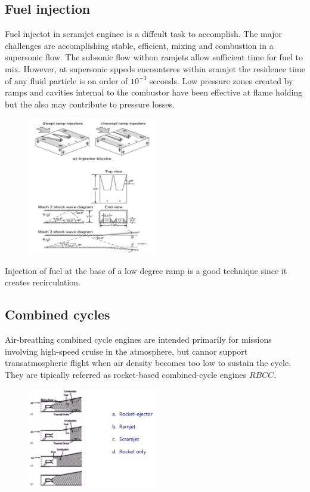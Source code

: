 \documentclass[12pt]{article}
\begin{document}
\subsection{Fuel injection}

Fuel injectot in scramjet enginee is a diffcult task to accomplish. The major challenges are accomplishing stable, efficient, mixing and combustion in a supersonic flow. The subsonic flow withon ramjets allow sufficient time for fuel to mix. However, at supersonic sppeds encounteres within sramjet the residence time of any fluid particle is on order of $10^{-3}$ seconds. Low pressure zones created by ramps and cavities internal to the combustor have been effective at flame holding but the also may contribute to pressure losses.

\begin{figure}[!ht]
\centering
\includegraphics[width=0.5\textwidth]{figures/injescram.png}
\end{figure}

Injection of fuel at the base of a low degree ramp is a good technique since it creates recirculation.

\subsection{Combined cycles}

Air-breathing combined cycle engines are intended primarily for missions involving high-speed cruise in the atmosphere, but cannor support transatmospheric flight when air density becomes too low to sustain the cycle. They are tipically referred as rocket-based combined-cycle engines $\textit{RBCC}$.

\begin{figure}[!ht]
\centering
\includegraphics[width=0.5\textwidth]{figures/injector.png}
\end{figure}
\end{document}

